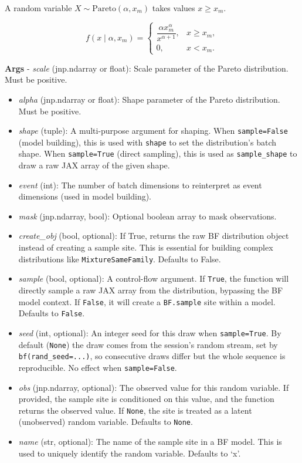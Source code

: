 \documentclass[
  letterpaper,
  DIV=11,
  numbers=noendperiod]{scrartcl}
\begin{document}
A random variable \(X \sim \text{Pareto}(\alpha, x_m)\) takes values
\(x \ge x_m\).

\[
  f(x \mid \alpha, x_m) =
  \begin{cases}
  \dfrac{\alpha x_m^\alpha}{x^{\alpha + 1}}, & x \ge x_m, \\
  0, & x < x_m.
  \end{cases}
  \]

\textbf{Args} - \emph{scale} (jnp.ndarray or float): Scale parameter of
the Pareto distribution. Must be positive.

\begin{itemize}
\item
  \emph{alpha} (jnp.ndarray or float): Shape parameter of the Pareto
  distribution. Must be positive.
\item
  \emph{shape} (tuple): A multi-purpose argument for shaping. When
  \texttt{sample=False} (model building), this is used with
  \texttt{shape} to set the distribution's batch shape. When
  \texttt{sample=True} (direct sampling), this is used as
  \texttt{sample\_shape} to draw a raw JAX array of the given shape.
\item
  \emph{event} (int): The number of batch dimensions to reinterpret as
  event dimensions (used in model building).
\item
  \emph{mask} (jnp.ndarray, bool): Optional boolean array to mask
  observations.
\item
  \emph{create\_obj} (bool, optional): If True, returns the raw BF
  distribution object instead of creating a sample site. This is
  essential for building complex distributions like
  \texttt{MixtureSameFamily}. Defaults to False.
\item
  \emph{sample} (bool, optional): A control-flow argument. If
  \texttt{True}, the function will directly sample a raw JAX array from
  the distribution, bypassing the BF model context. If \texttt{False},
  it will create a \texttt{BF.sample} site within a model. Defaults to
  \texttt{False}.
\item
  \emph{seed} (int, optional): An integer seed for this draw when
  \texttt{sample=True}. By default (\texttt{None}) the draw comes from
  the session's random stream, set by \texttt{bf(rand\_seed=...)}, so
  consecutive draws differ but the whole sequence is reproducible. No
  effect when \texttt{sample=False}.
\item
  \emph{obs} (jnp.ndarray, optional): The observed value for this random
  variable. If provided, the sample site is conditioned on this value,
  and the function returns the observed value. If \texttt{None}, the
  site is treated as a latent (unobserved) random variable. Defaults to
  \texttt{None}.
\item
  \emph{name} (str, optional): The name of the sample site in a BF
  model. This is used to uniquely identify the random variable. Defaults
  to `x'.
\end{itemize}
\end{document}
